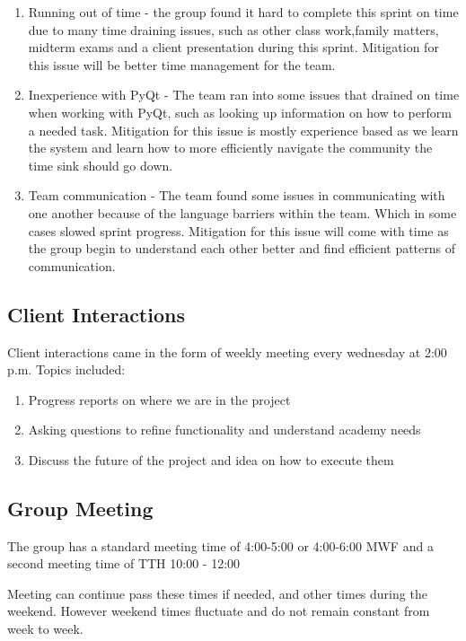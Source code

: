 \begin{enumerate}
\item Running out of time - the group found it hard to complete this sprint on time due to many time draining issues, such as other class work,family matters, midterm exams and a client presentation during this sprint. Mitigation for this issue will be better time management for the team.
\item Inexperience with PyQt - The team ran into some issues that drained on time when working with PyQt, such as looking up information on how to perform a needed task. Mitigation for this issue is mostly experience based as we learn the system and learn how to more efficiently navigate the community the time sink should go down.
\item Team communication - The team found some issues in communicating with one another because of the language barriers within the team. Which in some cases slowed sprint progress. Mitigation for this issue will come with time as the group begin to understand each other better and find efficient patterns of communication.
\end{enumerate}

\subsection{Client Interactions}

Client interactions came in the form of weekly meeting every wednesday at 2:00 p.m. Topics included:

\begin{enumerate}
\item Progress reports on where we are in the project
\item Asking questions to refine functionality and understand academy needs
\item Discuss the future of the project and idea on how to execute them
\end{enumerate}


\subsection{Group Meeting}

The group has a standard meeting time of 4:00-5:00 or 4:00-6:00 MWF and a second meeting time of TTH 10:00 - 12:00

Meeting can continue pass these times if needed, and other times during the weekend. However weekend times fluctuate and do not remain constant from week to week. 

